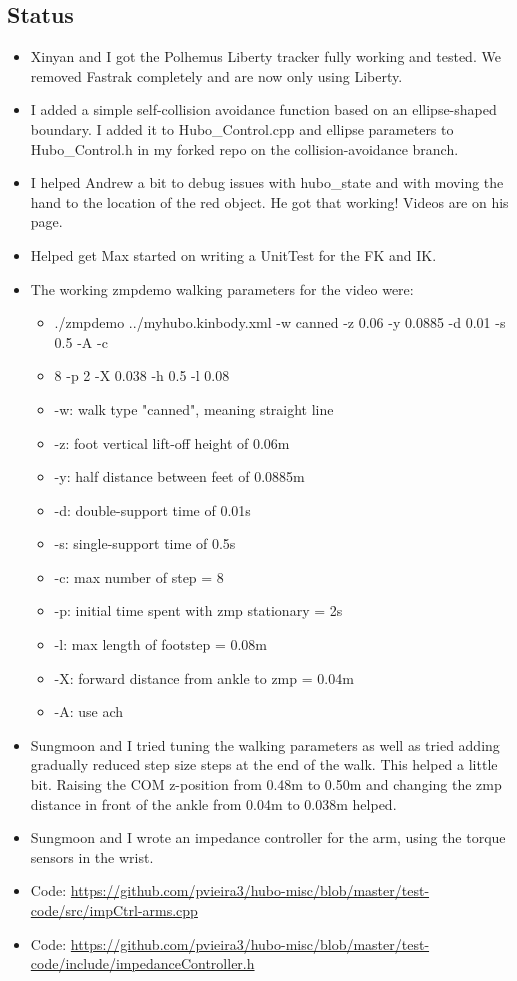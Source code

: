 \documentclass[letterpaper, 10 pt]{report}
\begin{document}
\subsection*{Status}
\begin{itemize}
\item Xinyan and I got the Polhemus Liberty tracker fully working and tested. We
removed Fastrak completely and are now only using Liberty.
\item I added a simple self-collision avoidance function based on an ellipse-shaped
boundary. I added it to Hubo\_Control.cpp and ellipse parameters to
Hubo\_Control.h in my forked repo on the collision-avoidance branch.
\item I helped Andrew a bit to debug issues with hubo\_state and with moving the hand
to the location of the red object. He got that working! Videos are on his page.
\item Helped get Max started on writing a UnitTest for the FK and IK.
\item The working zmpdemo walking parameters for the video were:
\begin{itemize}
\item ./zmpdemo ../myhubo.kinbody.xml -w canned -z 0.06 -y 0.0885 -d 0.01 -s 0.5 -A -c
\item 8 -p 2 -X 0.038 -h 0.5 -l 0.08
\item -w: walk type "canned", meaning straight line
\item -z: foot vertical lift-off height of 0.06m
\item -y: half distance between feet of 0.0885m
\item -d: double-support time of 0.01s
\item -s: single-support time of 0.5s
\item -c: max number of step = 8
\item -p: initial time spent with zmp stationary = 2s
\item -l: max length of footstep = 0.08m
\item -X: forward distance from ankle to zmp = 0.04m
\item -A: use ach
\end{itemize}
\item Sungmoon and I tried tuning the walking parameters as well as tried adding
gradually reduced step size steps at the end of the walk. This helped a little
bit. Raising the COM z-position from 0.48m to 0.50m and changing the zmp
distance in front of the ankle from 0.04m to 0.038m helped.
\item Sungmoon and I wrote an impedance controller for the arm, using the torque
sensors in the wrist.
\item Code:
\url{https://github.com/pvieira3/hubo-misc/blob/master/test-code/src/impCtrl-arms.cpp}
\item Code: \url{https://github.com/pvieira3/hubo-misc/blob/master/test-code/include/impedanceController.h} 
\end{itemize}
\end{document}
